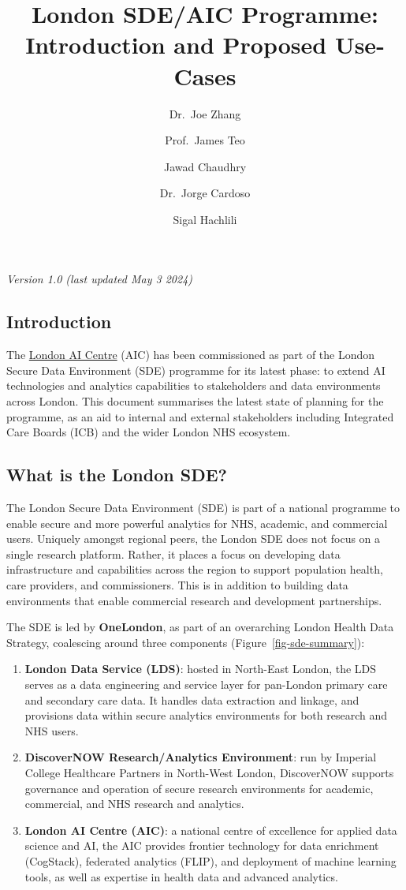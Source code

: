 \documentclass[
  letterpaper,
  DIV=11,
  numbers=noendperiod]{scrartcl}
\title{London SDE/AIC Programme: Introduction and Proposed Use-Cases}
\author{Dr.~Joe Zhang \and Prof.~James Teo \and Jawad
Chaudhry \and Dr.~Jorge Cardoso \and Sigal Hachlili}
\date{}
\begin{document}
\maketitle

\emph{Version 1.0 (last updated May 3 2024)}

\subsection{Introduction}\label{introduction}

The \href{https://www.aicentre.co.uk/}{London AI Centre} (AIC) has been
commissioned as part of the London Secure Data Environment (SDE)
programme for its latest phase: to extend AI technologies and analytics
capabilities to stakeholders and data environments across London. This
document summarises the latest state of planning for the programme, as
an aid to internal and external stakeholders including Integrated Care
Boards (ICB) and the wider London NHS ecosystem.

\subsection{What is the London SDE?}\label{what-is-the-london-sde}

The London Secure Data Environment (SDE) is part of a national programme
to enable secure and more powerful analytics for NHS, academic, and
commercial users. Uniquely amongst regional peers, the London SDE does
not focus on a single research platform. Rather, it places a focus on
developing data infrastructure and capabilities across the region to
support population health, care providers, and commissioners. This is in
addition to building data environments that enable commercial research
and development partnerships.

The SDE is led by \textbf{OneLondon}, as part of an overarching London
Health Data Strategy, coalescing around three components
(Figure~\ref{fig-sde-summary}):

\begin{enumerate}
\def\labelenumi{(\arabic{enumi})}
\item
  \textbf{London Data Service (LDS)}: hosted in North-East London, the
  LDS serves as a data engineering and service layer for pan-London
  primary care and secondary care data. It handles data extraction and
  linkage, and provisions data within secure analytics environments for
  both research and NHS users.
\item
  \textbf{DiscoverNOW Research/Analytics Environment}: run by Imperial
  College Healthcare Partners in North-West London, DiscoverNOW supports
  governance and operation of secure research environments for academic,
  commercial, and NHS research and analytics.
\item
  \textbf{London AI Centre (AIC)}: a national centre of excellence for
  applied data science and AI, the AIC provides frontier technology for
  data enrichment (CogStack), federated analytics (FLIP), and deployment
  of machine learning tools, as well as expertise in health data and
  advanced analytics.
\end{enumerate}
\end{document}
